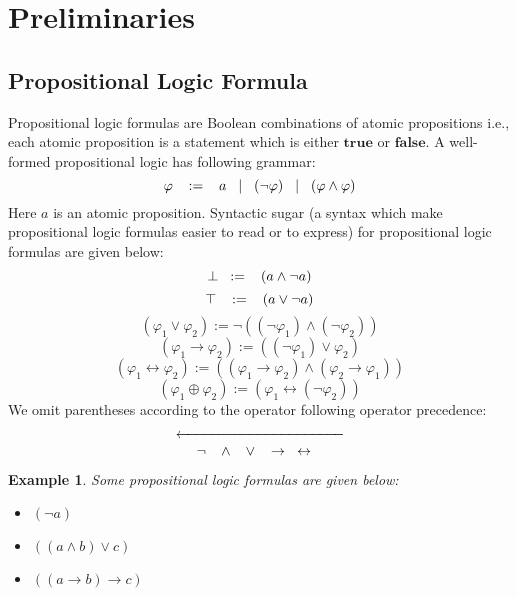 \newtheorem{example}{Example}
\section{Preliminaries}
\label{sec:preliminaries}
\subsection{Propositional Logic Formula}
Propositional logic formulas are Boolean combinations of atomic propositions i.e., each atomic proposition is a statement which is either $\mathbf{true}$ or $\mathbf{false}$. A well-formed propositional logic has following grammar:
$$\varphi\hspace{3mm} :=\hspace{3mm} a\hspace{3mm} |\hspace{3mm} (\neg \varphi)\hspace{3mm} |\hspace{3mm} (\varphi \wedge \varphi)$$
Here $a$ is an atomic proposition.\newline
Syntactic sugar (a syntax which make propositional logic formulas easier to read or to express) for propositional logic formulas are given below:
$$\perp\hspace{3mm}:=\hspace{3mm}(a\wedge\neg a)$$
$$\top\hspace{3mm}:=\hspace{3mm}(a\vee\neg a)$$
$$(\varphi_{1}\vee\varphi_{2}) := \neg((\neg \varphi_{1}) \wedge (\neg \varphi_{2})) $$
$$(\varphi_{1}\rightarrow\varphi_{2}) := ((\neg \varphi_{1}) \vee \varphi_{2}) $$
$$(\varphi_{1}\leftrightarrow\varphi_{2}) := ( (\varphi_{1}\rightarrow\varphi_{2}) \wedge (\varphi_{2}\rightarrow\varphi_{1}))$$
$$(\varphi_{1}\oplus\varphi_{2}) := (\varphi_{1} \leftrightarrow (\neg \varphi_{2})) $$
We omit parentheses according to the operator following operator precedence:
\[ \xleftarrow{\hspace*{4cm}} \]
$$\neg\hspace{3mm} \wedge\hspace{3mm} \vee\hspace{3mm} \rightarrow\hspace{3mm} \leftrightarrow\hspace{3mm} $$
\begin{example}
	Some propositional logic formulas are given below:
	\begin{itemize}
	\item $(\neg a)$
	\item $((a\wedge b)\vee c)$
	\item $((a\rightarrow b)\rightarrow c)$
	\end{itemize}
\end{example}
